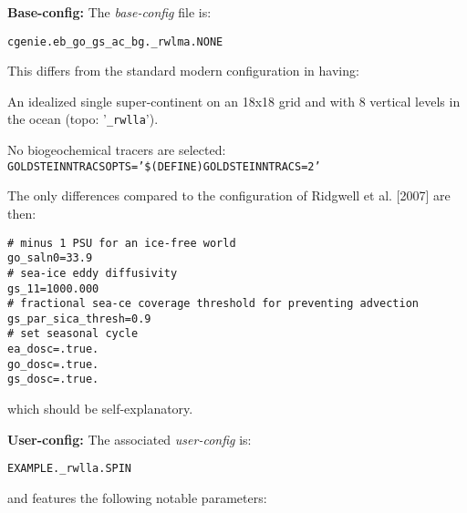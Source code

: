 \documentclass[10pt,twoside]{article}
\begin{document}
\noindent \textbf{Base-config:} The \textit{base-config} file is:
\vspace{-10pt}\begin{verbatim}cgenie.eb_go_gs_ac_bg._rwlma.NONE\end{verbatim}\vspace{-10pt}
This differs from the standard modern configuration in having:
        \begin{compactitem}
        \item An idealized single super-continent on an 18x18 grid and with 8 vertical levels in the ocean (topo: '\texttt{\_rwlla}').
                \item No biogeochemical tracers are selected: 
\texttt{GOLDSTEINNTRACSOPTS='\$(DEFINE)GOLDSTEINNTRACS=2'}
\item The only differences compared to the configuration of Ridgwell et al. [2007] are then:
        \vspace{-5pt}\begin{verbatim}
# minus 1 PSU for an ice-free world
go_saln0=33.9
# sea-ice eddy diffusivity
gs_11=1000.000
# fractional sea-ce coverage threshold for preventing advection
gs_par_sica_thresh=0.9
# set seasonal cycle
ea_dosc=.true.
go_dosc=.true.
gs_dosc=.true.
                \end{verbatim}\vspace{-5pt}
                which should be self-explanatory.
        \end{compactitem}

\noindent \textbf{User-config:} The associated \textit{user-config} is:
\vspace{-10pt}\begin{verbatim}EXAMPLE._rwlla.SPIN\end{verbatim}\vspace{-10pt}
and features the following notable parameters:
\end{document}
